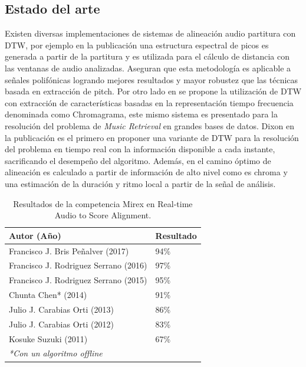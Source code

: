 \documentclass
  [ams,pdfout]%
	{aeslac}
\begin{document}
%
\subsection{Estado del arte}

Existen diversas implementaciones de sistemas de alineación audio partitura con DTW, por ejemplo en la publicación \cite{orio2001alignment} una estructura espectral de picos es generada a partir de la partitura y es utilizada para el cálculo de distancia con las ventanas de audio analizadas. Aseguran que esta metodología es aplicable a señales polifónicas logrando mejores resultados y mayor robustez que las técnicas basada en extracción de pitch. Por otro lado en \cite{dannenberg2006music} se propone la utilización de DTW con extracción de características basadas en la representación tiempo frecuencia denominada como Chromagrama, este mismo sistema es presentado para la resolución del problema de \textit{Music Retrieval} en grandes bases de datos. Dixon en la publicación \cite{dixon2005live} es el primero en proponer una variante de DTW para la resolución del problema en tiempo real con la información disponible a cada instante, sacrificando el desempeño del algoritmo. Además, en \cite{gagnon2007high} el camino óptimo de alineación es calculado a partir de información de alto nivel como es chroma y una estimación de la duración y ritmo local a partir de la señal de análisis. 

\begin{table}[!ht]
\caption{Resultados de la competencia Mirex en Real-time  Audio to Score Alignment.}
\label{tab:Mirex}
\vspace*{10pt}
\centering
\small
\begin{tabular}{ll}
\textbf{Autor (Año)}	&	\textbf{Resultado}\\ \hline
Francisco J. Bris Peñalver (2017)     & 94\%   \\
Francisco J. Rodriguez Serrano (2016) & 97\%   \\
Francisco J. Rodriguez Serrano (2015) & 95\%   \\
Chunta Chen* (2014)                   & 91\%   \\
Julio J. Carabias Orti (2013)         & 86\%   \\
Julio J. Carabias Orti (2012)         & 83\%   \\
Kosuke Suzuki (2011)                  & 67\%   \\
\textit{*Con un algoritmo offline}
\end{tabular}
\end{table}
\end{document}

